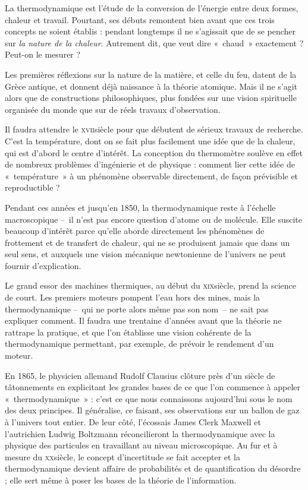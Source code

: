 La thermodynamique est l’étude de la conversion de l’énergie entre deux formes, chaleur et travail. Pourtant, ses débuts remontent bien avant que ces trois concepts ne soient établis : pendant longtemps il ne s’agissait que de se pencher sur \emph{la nature de la chaleur}. Autrement dit, que veut dire «~chaud~» exactement ? Peut-on le mesurer ?

Les premières réflexions sur la nature de la matière, et celle du feu, datent de la Grèce antique, et donnent déjà naissance à la théorie atomique. Mais il ne s’agit alors que de constructions philosophiques, plus fondées sur une vision spirituelle organisée du monde que sur de réels travaux d’observation.

Il faudra attendre le \textsc{xvii}\ieme siècle pour que débutent de sérieux travaux de recherche. C’est la température, dont on se fait plus facilement une idée que de la chaleur, qui est d’abord le centre  d’intérêt. La conception du thermomètre soulève en effet de nombreux problèmes d’ingénierie et de physique : comment lier cette idée de «~température~» à un phénomène observable directement, de façon prévisible et reproductible ?

Pendant ces années et jusqu’en 1850, la thermodynamique reste à l’échelle macroscopique –~il n’est pas encore question d’atome ou de molécule. Elle suscite beaucoup d’intérêt parce qu’elle aborde directement les phénomènes de frottement et de transfert de chaleur, qui ne se produisent jamais que dans un seul sens, et auxquels une vision mécanique newtonienne de l’univers ne peut fournir d’explication.

Le grand essor des machines thermiques, au début du \textsc{xix}\ieme siècle, prend la science de court. Les premiers moteurs pompent l’eau hors des mines, mais la thermodynamique –\ qui ne porte alors même pas son nom\ – ne sait pas expliquer comment. Il faudra une trentaine d’années avant que la théorie ne rattrape la pratique, et que l’on établisse une vision cohérente de la thermodynamique permettant, par exemple, de prévoir le rendement d’un moteur.

En 1865, le physicien allemand Rudolf Clausius clôture près d’un siècle de tâtonnements en explicitant les grandes bases de ce que l’on commence à appeler «~thermodynamique~» : c’est ce que nous connaissons aujourd’hui sous le nom des deux principes. Il généralise, ce faisant, ses observations sur un ballon de gaz à l’univers tout entier. 
De leur côté, l’écossais James Clerk Maxwell et l’autrichien Ludwig Boltzmann réconcilieront la thermodynamique avec la physique des particules en travaillant au niveau microscopique. Au fur et à mesure du \textsc{xx}\ieme siècle, le concept d’incertitude se fait accepter et la thermodynamique devient affaire de probabilités et de quantification du désordre ; elle sert même à poser les bases de la théorie de l’information.

